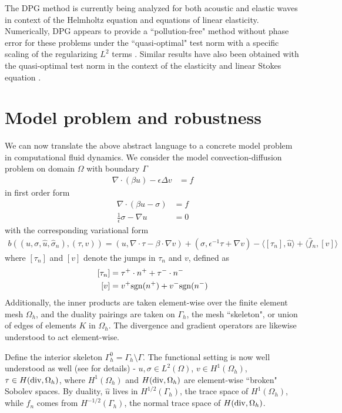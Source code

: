 \documentclass[11pt,onecolumn]{scrartcl}
\newcommand{\grad}{\nabla}
\renewcommand{\div}{\grad \cdot}
\begin{document}
The DPG method is currently being analyzed for both acoustic and elastic waves in context of the Helmholtz equation and equations of linear elasticity.  Numerically, DPG appears to provide a ``pollution-free" method without phase error for these problems under the ``quasi-optimal" test norm with a specific scaling of the regularizing $L^2$ terms \cite{DPG4}. Similar results have also been obtained with the quasi-optimal test norm in the context of the elasticity \cite{DPGElas} and linear Stokes equation \cite{Camellia}. 

\section{Model problem and robustness}

We can now translate the above abstract language to a concrete model problem in computational fluid dynamics.  We consider the model convection-diffusion problem on domain $\Omega$ with boundary $\Gamma$
\begin{align}
\div (\beta u) - \epsilon\Delta v &= f  \label{primal}
\end{align}
in first order form
\begin{align*}
\div (\beta u - \sigma) &= f  \\
\frac{1}{\epsilon}\sigma - \grad u &= 0
\end{align*}
with the corresponding variational form 
\begin{align*}
b\left(\left(u,\sigma, \widehat{u}, \widehat{\sigma}_n\right), \left(\tau, v\right)\right) = \left(u,\div \tau - \beta \cdot \grad v\right) + \left(\sigma, \epsilon^{-1} \tau + \grad v\right) - \langle \left[\tau_n\right], \widehat{u} \rangle + \langle \widehat{f}_n, \left[v\right] \rangle 
\end{align*}
where $\left[ \tau_n \right]$ and $\left[ v\right]$ denote the jumps in $\tau_n$ and $v$, defined as
\begin{align*}
\left[ \tau_n \right] &= \tau^+ \cdot n^+ + \tau^-\cdot n^-\\
\left[ v\right] &= v^+{\rm sgn}(n^+) + v^-{\rm sgn}(n^-)
\end{align*}
Additionally, the inner products are taken element-wise over the finite element mesh $\Omega_h$, and the duality pairings are taken on $\Gamma_h$, the mesh ``skeleton", or union of edges of elements $K$ in $\Omega_h$.  The divergence and gradient operators are likewise understood to act element-wise. 

Define the interior skeleton $\Gamma_h^0 = \Gamma_h \setminus \Gamma$.  The functional setting is now well understood as well (see \cite{analysisDPG} for details) - $u,\sigma \in L^2(\Omega)$, $v \in H^1(\Omega_h)$, $\tau \in H({\rm div},\Omega_h)$, where $H^1(\Omega_h)$ and $H({\rm div},\Omega_h)$ are element-wise ``broken" Sobolev spaces.  By duality, $\widehat{u}$ lives in $H^{1/2}(\Gamma_h)$, the trace space of $H^1(\Omega_h)$, while $\widehat{f}_n$ comes from $H^{-1/2}(\Gamma_h)$, the normal trace space of $H({\rm div},\Omega_h)$.  
\end{document}

